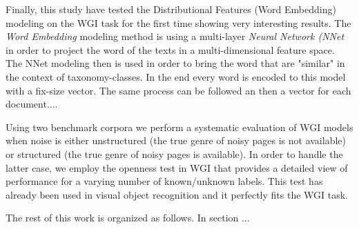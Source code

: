 \documentclass[
    11pt, %
    english, %
    singlespacing, %
    headsepline, %
]{DoctoralThesis} %
\begin{document}
Finally, this study have tested the Distributional Features (Word Embedding) modeling on the WGI task for the first time showing very interesting results. The \textit{Word Embedding} modeling method is using a multi-layer \textit{Neural Network (NNet} in order to project the word of the texts in a multi-dimensional feature space. The NNet modeling then is used in order to bring the word that are "similar" in the context of taxonomy-classes. In the end every word is encoded to this model with a fix-size vector. The same process can be followed an then a vector for each document....

Using two benchmark corpora we perform a systematic evaluation of WGI models when noise is either unstructured (the true genre of noisy pages is not available) or structured (the true genre of noisy pages is available). In order to handle the latter case, we employ the openness test in WGI that provides a detailed view of performance for a varying number of known/unknown labels. This test has already been used in visual object recognition \parencite{scheirer2013toward} and it perfectly fits the WGI task.

The rest of this work is organized as follows. In section ...










\printbibliography[heading=bibintoc]
\end{document}
